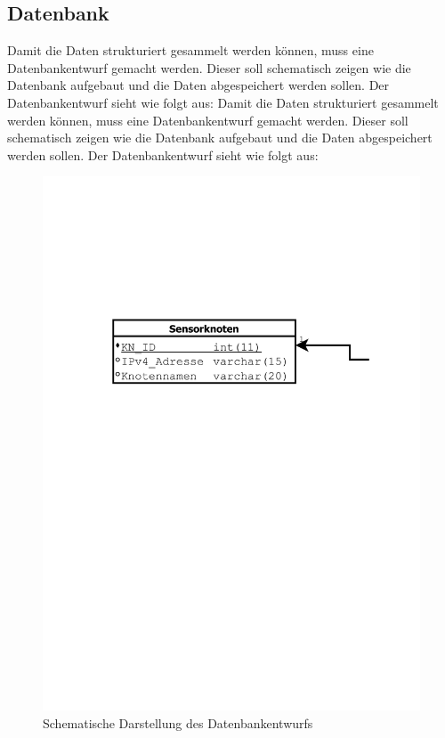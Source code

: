 \subsection{Datenbank}\label{sub:Datenbank}
Damit die Daten strukturiert gesammelt werden können, muss eine Datenbankentwurf gemacht werden. Dieser soll schematisch zeigen wie die Datenbank aufgebaut und die Daten abgespeichert werden sollen. Der Datenbankentwurf sieht wie folgt aus:
Damit die Daten strukturiert gesammelt werden können, muss eine Datenbankentwurf gemacht werden. Dieser soll schematisch zeigen wie die Datenbank aufgebaut und die Daten abgespeichert werden sollen. Der Datenbankentwurf sieht wie folgt aus:
\begin{landscape}
	\begin{figure}[ht]
		\includegraphics[width=\linewidth, height=.9\textheight]{Bilder/Kapitel3/Datenbankentwurf.pdf}
			\caption[Schematische Darstellung des Datenbankentwurfs]{Schematische Darstellung des Datenbankentwurfs}
			\label{fig:Datenbankentwurf}
		\end{figure}
	\end{landscape}
